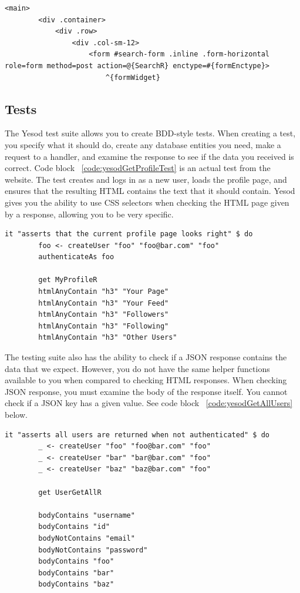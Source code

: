 \begin{lstlisting}[caption={Template file for the search page},label={code:yesodSearchHamlet}]
	<main>
		<div .container>
			<div .row>
				<div .col-sm-12>
					<form #search-form .inline .form-horizontal role=form method=post action=@{SearchR} enctype=#{formEnctype}>
						^{formWidget}

\end{lstlisting}

\subsection{Tests}
The Yesod test suite allows you to create BDD-style tests. When creating a test,
you specify what it should do, create any database entities you need, make a
request to a handler, and examine the response to see if the data you received
is correct. Code block ~\ref{code:yesodGetProfileTest} is an actual test
from the website. The test creates and logs in as a new user, loads
the profile page, and ensures that the resulting HTML contains the text that
it should contain. Yesod gives you the ability to use CSS selectors when checking
the HTML page given by a response, allowing you to be very specific.

\begin{lstlisting}[caption={Test the profile page},label={code:yesodGetProfileTest}]
	it "asserts that the current profile page looks right" $ do
		foo <- createUser "foo" "foo@bar.com" "foo"
		authenticateAs foo

		get MyProfileR
		htmlAnyContain "h3" "Your Page"
		htmlAnyContain "h3" "Your Feed"
		htmlAnyContain "h3" "Followers"
		htmlAnyContain "h3" "Following"
		htmlAnyContain "h3" "Other Users"
\end{lstlisting}

The testing suite also has the ability to check if a JSON response contains the
data that we expect. However, you do not have the same helper functions available
to you when compared to checking HTML responses. When checking JSON response, you
must examine the body of the response itself. You cannot check if a JSON key has
a given value. See code block ~\ref{code:yesodGetAllUsers} below.

\begin{lstlisting}[caption={Checking a JSON response},label={code:yesodGetAllUsers}]
	it "asserts all users are returned when not authenticated" $ do
		_ <- createUser "foo" "foo@bar.com" "foo"
		_ <- createUser "bar" "bar@bar.com" "foo"
		_ <- createUser "baz" "baz@bar.com" "foo"

		get UserGetAllR

		bodyContains "username"
		bodyContains "id"
		bodyNotContains "email"
		bodyNotContains "password"
		bodyContains "foo"
		bodyContains "bar"
		bodyContains "baz"
\end{lstlisting}
